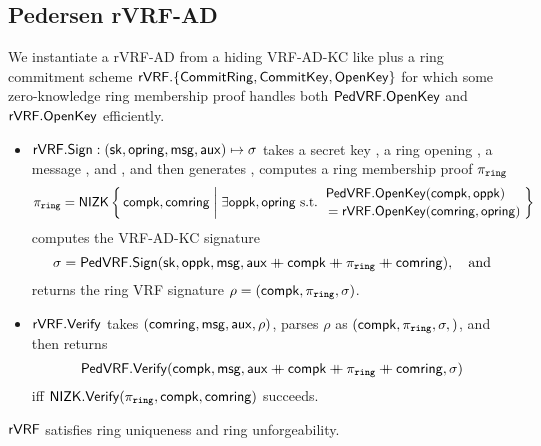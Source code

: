 
\subsection{Pedersen rVRF-AD}

We instantiate a rVRF-AD from a hiding VRF-AD-KC like \PedVRF plus
a ring commitment scheme
 ${\mathsf{rVRF}}.\{ {\mathsf{CommitRing}}, {\mathsf{CommitKey}}, {\mathsf{OpenKey}} \}$
for which some zero-knowledge ring membership proof handles both
 ${\mathsf{PedVRF}}.{\mathsf{OpenKey}}$ and ${\mathsf{rVRF}}.{\mathsf{OpenKey}}$
efficiently.

\begin{itemize}
\item ${\mathsf{rVRF}}.{\mathsf{Sign}} : (\mathsf{sk},\mathsf{opring},\mathsf{msg},\mathsf{aux}) \mapsto \sigma$ takes
 a secret key \sk, a ring opening \openring, a message \msg, and \aux, and then %
 generates \openpk, computes a ring membership proof $\piring$
  $$ \piring = \NIZK \Setst{ \compk, \comring }{
  \exists \openpk,\openring \textrm{\ s.t.\ } 
  \genfrac{}{}{0pt}{}{\PedVRF.\OpenKey(\compk,\openpk) \quad}{\,\, = \rVRF.\OpenKey(\comring,\openring)}
  } $$
 computes the VRF-AD-KC signature
  $$ \sigma = {\mathsf{PedVRF}}.{\mathsf{Sign}}(\mathsf{sk},\mathsf{oppk},\mathsf{msg},\mathsf{aux} \mathbin{+\mkern-10mu+} \mathsf{compk} \mathbin{+\mkern-10mu+} \pi_{\mathtt{ring}} \mathbin{+\mkern-10mu+} \mathsf{comring}), \quad\textrm{and} $$ %
 returns the ring VRF signature $\rho = (\mathsf{compk},\pi_{\mathtt{ring}},\sigma)$.
\item ${\mathsf{rVRF}}.{\mathsf{Verify}}$ takes $(\mathsf{comring},\mathsf{msg},\mathsf{aux},\rho)$,
 parses $\rho$ as $(\mathsf{compk},\pi_{\mathtt{ring}},\sigma,)$,  and then returns
 $$ {\mathsf{PedVRF}}.{\mathsf{Verify}}(\mathsf{compk},\mathsf{msg},\mathsf{aux} \mathbin{+\mkern-10mu+} \mathsf{compk} \mathbin{+\mkern-10mu+} \pi_{\mathtt{ring}} \mathbin{+\mkern-10mu+} \mathsf{comring},\sigma) $$
 iff ${\mathsf{NIZK}}.{\mathsf{Verify}}(\pi_{\mathtt{ring}},\mathsf{compk},\mathsf{comring})$ succeeds. 
\end{itemize}

\begin{proposition}\label{prop:pedersen_rvrf}
${\mathsf{rVRF}}$ satisfies ring uniqueness and ring unforgeability.
\end{proposition}







\endinput










In this, we tie $\sigma$ to $\piring$ by expanding $\sigma$'s auxiliary data with $\piring$.

